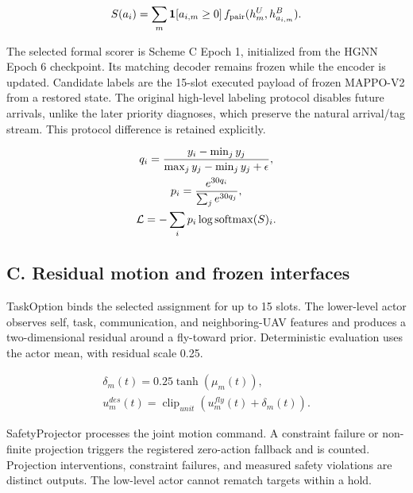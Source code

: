 \begin{equation*}
\begin{gathered}
S(a_i)=\sum_m {\bf1}[a_{i,m}\ge0]\, f_{\rm pair}(h_m^U,h_{a_{i,m}}^B).
\end{gathered}
\end{equation*}

The selected formal scorer is Scheme C Epoch 1, initialized from the HGNN Epoch 6 checkpoint. Its matching decoder remains frozen while the encoder is updated. Candidate labels are the 15-slot executed payload of frozen MAPPO-V2 from a restored state. The original high-level labeling protocol disables future arrivals, unlike the later priority diagnoses, which preserve the natural arrival/tag stream. This protocol difference is retained explicitly.

\begin{equation*}
\begin{gathered}
q_i={y_i-\min_j y_j\over \max_j y_j-\min_j y_j+\epsilon},\\ p_i={e^{30q_i}\over\sum_j e^{30q_j}},\\ {\cal L}=-\sum_i p_i\log{\operatorname{softmax}(S)_i}.
\end{gathered}
\end{equation*}

\subsection*{C. Residual motion and frozen interfaces}

TaskOption binds the selected assignment for up to 15 slots. The lower-level actor observes self, task, communication, and neighboring-UAV features and produces a two-dimensional residual around a fly-toward prior. Deterministic evaluation uses the actor mean, with residual scale 0.25.

\begin{equation*}
\begin{gathered}
\delta_m(t)=0.25\tanh(\mu_m(t)),\\ u_m^{des}(t)=\operatorname{clip}_{unit}(u_m^{fly}(t)+\delta_m(t)).
\end{gathered}
\end{equation*}

SafetyProjector processes the joint motion command. A constraint failure or non-finite projection triggers the registered zero-action fallback and is counted. Projection interventions, constraint failures, and measured safety violations are distinct outputs. The low-level actor cannot rematch targets within a hold.

